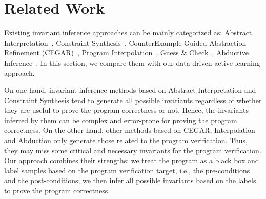 
\section{Related Work} %
\label{sec:related}


Existing invariant inference approaches can be mainly categorized as: 
Abstract Interpretation~\cite{cousot1978automatic,mine2006octagon,cousot1979systematic,karr1976affine,vincent2009subpolyhedra}, 
Constraint Synthesis~\cite{ashutosh2009invgen,michael2003linear,sumit2009constraint}, 
CounterExample Guided Abstraction Refinement (CEGAR)~\cite{henzinger2003software,thomas2001slam,edmund2003counterexample}, 
Program Interpolation~\cite{kenneth2010lazy,thomas2004abstractions,kenneth2003interpolation,Kenneth2006lazy}, 
Guess \& Check~\cite{cormac2001houdini,ernst2007daikon}, 
Abductive Inference~\cite{isil2013inductive}. 
In this section, we compare them with our data-driven active learning approach. 

On one hand, invariant inference methods based on Abstract Interpretation and Constraint Synthesis 
tend to generate all possible invariants regardless of 
whether they are useful to prove the program correctness or not. 
Hence, the invariants inferred by them can be complex and error-prone for proving the program correctness. 
On the other hand, other methods based on CEGAR, Interpolation and Abduction 
only generate those related to the program verification. 
Thus, they may miss some critical and necessary invariants for the program verification. 
Our approach combines their strengths: 
we treat the program as a black box 
and label samples based on the program verification target, 
i.e., the pre-conditions and the post-conditions; 
we then infer all possible invariants based on the labels 
to prove the program correctness. 

